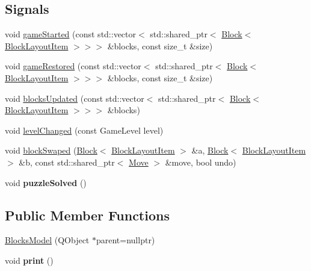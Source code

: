 \subsection*{Signals}
\begin{DoxyCompactItemize}
\item 
void \mbox{\hyperlink{class_blocks_model_ad4beaf1054214a1688033489a0817a8b}{game\+Started}} (const std\+::vector$<$ std\+::shared\+\_\+ptr$<$ \mbox{\hyperlink{class_block}{Block}}$<$ \mbox{\hyperlink{class_block_layout_item}{Block\+Layout\+Item}} $>$$>$$>$ \&blocks, const size\+\_\+t \&size)
\item 
void \mbox{\hyperlink{class_blocks_model_a1b26e86f148e270ac598aa24accc718b}{game\+Restored}} (const std\+::vector$<$ std\+::shared\+\_\+ptr$<$ \mbox{\hyperlink{class_block}{Block}}$<$ \mbox{\hyperlink{class_block_layout_item}{Block\+Layout\+Item}} $>$$>$$>$ \&blocks, const size\+\_\+t \&size)
\item 
void \mbox{\hyperlink{class_blocks_model_ab2870995b5c7936d0e0f7afe41e7fbeb}{blocks\+Updated}} (const std\+::vector$<$ std\+::shared\+\_\+ptr$<$ \mbox{\hyperlink{class_block}{Block}}$<$ \mbox{\hyperlink{class_block_layout_item}{Block\+Layout\+Item}} $>$$>$$>$ \&blocks)
\item 
void \mbox{\hyperlink{class_blocks_model_aadc67f8541695e398bd80f66690308c4}{level\+Changed}} (const Game\+Level level)
\item 
void \mbox{\hyperlink{class_blocks_model_a7fb837fa85f6de3b9e3bc56a590f734e}{block\+Swaped}} (\mbox{\hyperlink{class_block}{Block}}$<$ \mbox{\hyperlink{class_block_layout_item}{Block\+Layout\+Item}} $>$ \&a, \mbox{\hyperlink{class_block}{Block}}$<$ \mbox{\hyperlink{class_block_layout_item}{Block\+Layout\+Item}} $>$ \&b, const std\+::shared\+\_\+ptr$<$ \mbox{\hyperlink{struct_move}{Move}} $>$ \&move, bool undo)
\item 
\mbox{\label{class_blocks_model_a0511c008064fa694adfc249c096609bb}} 
void {\bfseries puzzle\+Solved} ()
\end{DoxyCompactItemize}
\subsection*{Public Member Functions}
\begin{DoxyCompactItemize}
\item 
\mbox{\hyperlink{class_blocks_model_a0c3da3595fe9984f7ac2c02cef09c03d}{Blocks\+Model}} (Q\+Object $\ast$parent=nullptr)
\item 
\mbox{\label{class_blocks_model_a115cbe7c4e49a128ebcbae3b5c6c24ee}} 
void {\bfseries print} ()
\end{DoxyCompactItemize}


